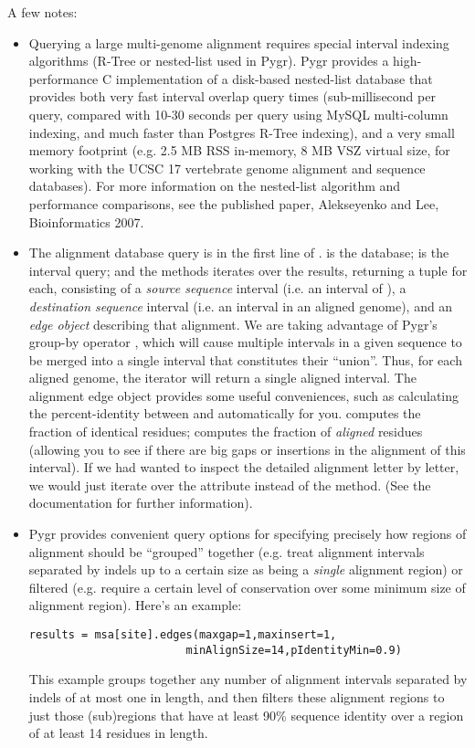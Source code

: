 \documentclass{howto}
\begin{document}
A few notes:

\begin{itemize}

\item
Querying a large multi-genome alignment requires special interval indexing
algorithms (R-Tree or nested-list used in Pygr).  Pygr provides a high-performance
C implementation of a disk-based nested-list database that provides both
very fast interval overlap query times (sub-millisecond per query, compared with
10-30 seconds per query using MySQL multi-column indexing, and much faster
than Postgres R-Tree indexing), and a very small memory footprint
(e.g. 2.5 MB RSS in-memory, 8 MB VSZ virtual size,
for working with the UCSC 17 vertebrate
genome alignment and sequence databases).  For more information on the
nested-list algorithm and performance comparisons, see the published paper,
Alekseyenko and Lee, Bioinformatics 2007.

\item
The alignment database query is in the first line of .
 is the database;  is the interval query; and the
 methods iterates over the results, returning a tuple for
each, consisting of a {\em source sequence} interval (i.e. an interval of
), a {\em destination sequence} interval (i.e. an interval in
an aligned genome), and an {\em edge object} describing that alignment.
We are taking advantage of Pygr's group-by operator ,
which will cause multiple intervals in a given sequence to be merged
into a single interval that constitutes their ``union''.  Thus,
for each aligned genome, the  iterator will return a single
aligned interval.  The alignment edge object provides some useful 
conveniences, such as calculating the percent-identity between 
and  automatically for you.   computes
the fraction of identical residues;  computes the 
fraction of {\em aligned} residues (allowing you to see if there are 
big gaps or insertions in the alignment of this interval).  If we 
had wanted to inspect the detailed alignment letter by letter, we
would just iterate over the  attribute instead of
the  method. (See the  documentation for 
further information).

\item
Pygr provides convenient query options for specifying precisely how regions
of alignment should be ``grouped'' together (e.g. treat alignment intervals
separated by indels up to a certain size as being a {\em single} alignment
region) or filtered (e.g. require a certain level of conservation over some
minimum size of alignment region).  Here's an example:
\begin{verbatim}
results = msa[site].edges(maxgap=1,maxinsert=1,
                        minAlignSize=14,pIdentityMin=0.9)
\end{verbatim}
This example groups together any number of alignment intervals separated by indels
of at most one in length, and then filters these alignment regions to
just those (sub)regions that have at least 90\% sequence identity over
a region of at least 14 residues in length.


\end{itemize}
\end{document}
